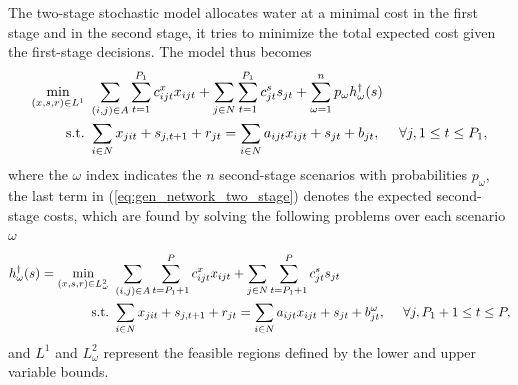 \documentclass[12pt]{amsart}
\newcommand{\st}{\mbox{s.t.}}
\begin{document}
The two-stage stochastic model allocates water at a minimal cost in the first stage and in the second stage, it tries to minimize the total expected cost given the first-stage decisions.   
The model thus becomes
\begin{align}
	\min_{(x,s,r) \in L^1} \ & \sum_{(i,j) \in A} \sum_{t=1}^{P_1} c_{ijt}^x x_{ijt} + \sum_{j \in N} \sum_{t=1}^{P_1} c_{jt}^s s_{jt} + \sum_{\omega=1}^n p_\omega h^\dagger_\omega(s) \label{eq:gen_network_two_stage} \\
	\st \ & \sum_{i \in N} x_{jit} + s_{j,t+1} + r_{jt} = \sum_{i \in N} a_{ijt} x_{ijt} + s_{jt} + b_{jt},\ \ \ \ \forall j, 1 \leq t \leq P_1, \notag
\end{align}
where the $\omega$ index indicates the $n$ second-stage scenarios with probabilities $p_\omega$, the last term in (\ref{eq:gen_network_two_stage}) denotes the expected second-stage costs, which are found by solving the following problems over each scenario $\omega$
\begin{align}
	h^\dagger_\omega(s) = \min_{(x,s,r) \in L^2_\omega} \ & \sum_{(i,j) \in A} \sum_{t=P_1+1}^{P} c_{ijt}^x x_{ijt} + \sum_{j \in N} \sum_{t=P_1+1}^{P} c_{jt}^s s_{jt} \label{eq:gen_network_second_stage} \\
	\st \ & \sum_{i \in N} x_{jit} + s_{j,t+1} + r_{jt} = \sum_{i \in N} a_{ijt} x_{ijt} + s_{jt} + b_{jt}^\omega, \ \ \ \ \forall j, P_1+1 \leq t \leq P, \notag
\end{align}
and $L^1$ and $L^2_\omega$ represent the feasible regions defined by the lower and upper variable bounds.
\end{document}
